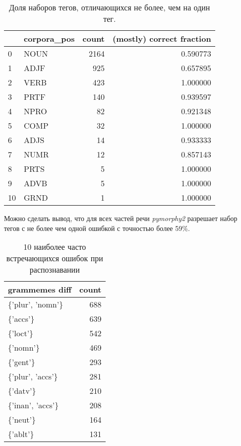 \documentclass[a4paper,14pt]{article}
\begin{document}
	\begin{table}[h!]
	\begin{center}
		\begin{tabular}{llrr}
		\toprule
		{} & corpora\_pos &  count &  (mostly) correct fraction \\
		\midrule
		0  &        NOUN &   2164 &                   0.590773 \\
		1  &        ADJF &    925 &                   0.657895 \\
		2  &        VERB &    423 &                   1.000000 \\
		3  &        PRTF &    140 &                   0.939597 \\
		4  &        NPRO &     82 &                   0.921348 \\
		5  &        COMP &     32 &                   1.000000 \\
		6  &        ADJS &     14 &                   0.933333 \\
		7  &        NUMR &     12 &                   0.857143 \\
		8  &        PRTS &      5 &                   1.000000 \\
		9  &        ADVB &      5 &                   1.000000 \\
		10 &        GRND &      1 &                   1.000000 \\
		\bottomrule
		\end{tabular}
		\caption{Доля наборов тегов, отличающихся не более, чем на один тег.}
		\end{center}
	\end{table}

	Можно сделать вывод, что для всех частей речи \textit{pymorphy2} разрешает набор тегов с не более чем одной ошибкой с точностью более 59\%.
	\begin{table}[h!]
	\begin{center}
	\begin{tabular}{lr}
		\toprule
		grammemes diff &  count \\
		\midrule
		\{'plur', 'nomn'\} &     688 \\
		\{'accs'\}         &     639 \\
		\{'loct'\}         &     542 \\
		\{'nomn'\}         &     469 \\
		\{'gent'\}         &     293 \\
		\{'plur', 'accs'\} &     281 \\
		\{'datv'\}         &     210 \\
		\{'inan', 'accs'\} &     208 \\
		\{'neut'\}         &     164 \\
		\{'ablt'\}         &     131 \\
		\bottomrule
		\end{tabular}
		\caption{10 наиболее часто встречающихся ошибок при распознавании}
		\end{center}
	\end{table}
\end{document}
